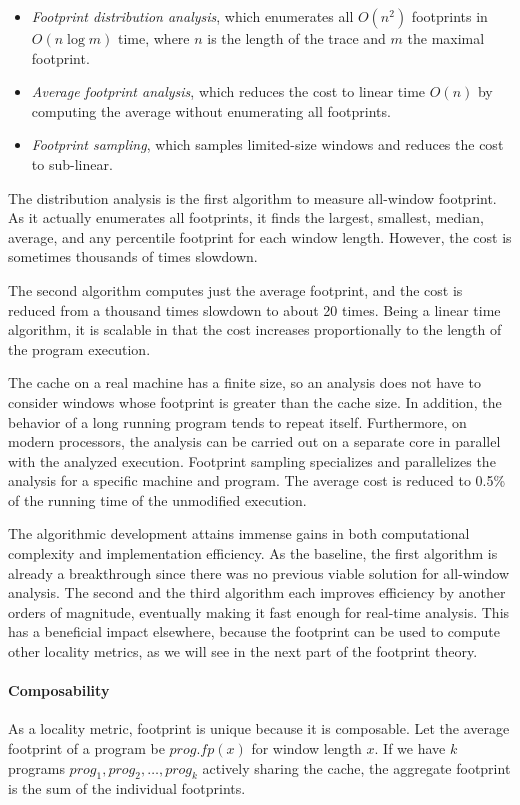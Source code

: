 \begin{itemize}
\item \emph{Footprint distribution analysis}, which enumerates 
  all $O(n^2)$ footprints in $O(n \log m)$ time, where $n$ is the 
  length of the trace and $m$ the maximal footprint.
\item \emph{Average footprint analysis}, which reduces the cost to
  linear time $O(n)$ by computing the average without enumerating all
  footprints.
\item \emph{Footprint sampling}, which samples limited-size windows and reduces the cost to sub-linear.
\end{itemize}

The distribution analysis is the first algorithm to measure
all-window footprint.  As it actually enumerates all footprints, it
finds the largest, smallest, median, average, and any percentile
footprint for each window length.  However, the cost is sometimes
thousands of times slowdown.

The second algorithm computes just the average footprint, and the
cost is reduced from a thousand times slowdown to about 20 times.  Being a linear time
algorithm, it is scalable in that the cost increases proportionally to
the length of the program execution.

The cache on a real machine has a finite size, so an analysis does
not have to consider windows whose footprint is greater than the cache
size.  In addition, the behavior of a long running
program tends to repeat itself.  Furthermore, on modern
processors, the analysis can be carried out on a separate core in
parallel with the analyzed execution.
Footprint sampling specializes and parallelizes the
analysis for a specific machine and program.  The average
cost is reduced to 0.5\% of the running time of the unmodified execution.

The algorithmic development attains immense gains in both
computational complexity and implementation efficiency.  As the baseline, the first algorithm is
already a breakthrough since there was no previous viable solution for
all-window analysis.  The second and the third algorithm each
improves efficiency by another
orders of magnitude, eventually making it fast enough for
real-time analysis.  This has a beneficial impact elsewhere, because
the footprint can be used to compute other locality
metrics, as we will see in the next part of the footprint theory.

\paragraph{Composability}
As a locality metric, footprint is unique because it is composable.  
Let the average footprint of a program be $prog.fp(x)$ for window
length $x$.  If we have $k$ programs $prog_1, prog_2, \dots,
prog_k$ actively sharing the cache, the aggregate footprint is
the sum of the individual footprints.

